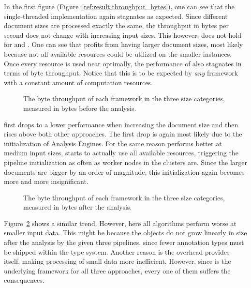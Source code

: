 In the first figure (Figure~\ref{ref:result:throughput_bytes}), one can see that the single-threaded implementation again stagnates as expected. Since different document sizes are processed exactly the same, the throughput in bytes per second does not change with increasing input sizes. This however, does not hold for \uimaas{} and \spark{}. One can see that \uimaas{} profits from having larger document sizes, most likely because not all available resources could be utilized on the smaller instances. Once every resource is used near optimally, the performance of \uimaas{} also stagnates in terms of byte throughput. Notice that this is to be expected by \emph{any} framework with a constant amount of computation resources.
\begin{figure}[htb]
	\centering
	\resizebox{1.\linewidth}{!}{\small}
	\caption{The byte throughput of each framework in the three size categories, measured in bytes before the analysis.}
	\label{fig:result:throughput_bytes}
\end{figure}
\spark{} first drops to a lower performance when increasing the document size and then rises above both other approaches. The first drop is again most likely due to the initialization of Analysis Engines. For the same reason \uimaas{} performs better at medium input sizes, \spark{} starts to actually use all available resources, triggering the pipeline initialization as often as worker nodes in the \spark{} clusters are. Since the larger documents are bigger by an order of magnitude, this initialization again becomes more and more insignificant.
\begin{figure}[htb]
	\centering
	\resizebox{1.\linewidth}{!}{\small}
	\caption{The byte throughput of each framework in the three size categories, measured in bytes after the analysis.}
	\label{fig:result:throughput_bytes_after}
\end{figure}
Figure~\ref{fig:result:throughput_bytes_after} shows a similar trend. However, here all algorithms perform worse at smaller input data. This might be because the \cas{} objects do not grow linearly in size after the analysis by the given three pipelines, since fewer annotation types must be shipped within the type system. Another reason is the overhead \uima{} provides itself, making processing of small data more inefficient. However, since \uima{} is the underlying framework for all three approaches, every one of them suffers the consequences.




